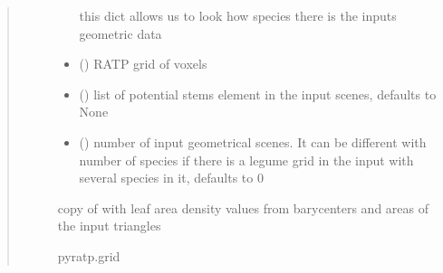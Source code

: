 \documentclass[letterpaper,10pt,english]{sphinxmanual}
\begin{document}
\begin{fulllineitems}
\begin{quote}
\begin{description}
\begin{itemize}
\sphinxAtStartPar
this dict allows us to look how species there is the inputs geometric data


\item {} 
\sphinxAtStartPar
{} () \textendash{} RATP grid of voxels

\item {} 
\sphinxAtStartPar
{} (\sphinxstyleliteralemphasis{\sphinxupquote{, }}) \textendash{} list of potential stems element in the input scenes, defaults to None

\item {} 
\sphinxAtStartPar
{} (\sphinxstyleliteralemphasis{\sphinxupquote{, }}) \textendash{} number of input geometrical scenes. It can be different with number of species if there is a l\sphinxhyphen{}egume grid in the input with several species in it, defaults to 0

\end{itemize}

\sphinxAtStartPar
copy of  with leaf area density values from barycenters and areas of the input triangles

\sphinxAtStartPar
pyratp.grid

\end{description}\end{quote}

\end{fulllineitems}

\end{document}
